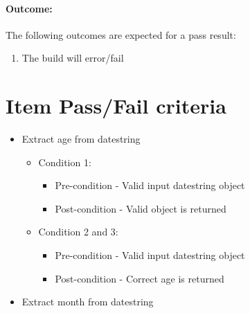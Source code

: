 \documentclass{article}
\begin{document}
\paragraph{Outcome:} The following outcomes are expected for a pass result:
\begin{enumerate}
	\item The build will error/fail
\end{enumerate}

\pagebreak

\section{Item Pass/Fail criteria}\label{sec:FailPass}
\begin{itemize}
\item Extract age from datestring
\begin{itemize}
	\item Condition 1:
	\begin{itemize}
		\item Pre-condition - Valid input datestring object
		\item Post-condition - Valid object is returned
	\end{itemize}
	\item Condition 2 and 3:
	\begin{itemize}
		\item Pre-condition - Valid input datestring object
		\item Post-condition - Correct age is returned
	\end{itemize}

\end{itemize}
\item Extract month from datestring


\end{itemize}
\end{document}
